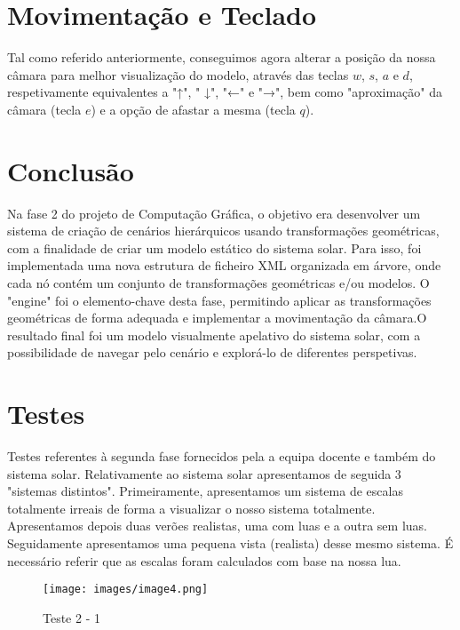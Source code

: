 \documentclass{article}
\begin{document}
\newpage
\section{Movimentação e Teclado}

Tal como referido anteriormente, conseguimos agora alterar a posição da nossa câmara para melhor visualização do modelo, através das teclas $w$, $s$, $a$ e $d$, respetivamente equivalentes a "↑", " ↓", "←" e "→", bem como "aproximação" da câmara (tecla $e$) e a opção de afastar a mesma (tecla $q$).

\newpage

\section{Conclusão}
Na fase 2 do projeto de Computação Gráfica, o objetivo era desenvolver um sistema de criação de cenários hierárquicos usando transformações geométricas, com a finalidade de criar um modelo estático do sistema solar. Para isso, foi implementada uma nova estrutura de ficheiro XML organizada em árvore, onde cada nó contém um conjunto de transformações geométricas e/ou modelos. O "engine" foi o elemento-chave desta fase, permitindo aplicar as transformações geométricas de forma adequada e implementar a movimentação da câmara.O resultado final foi um modelo visualmente apelativo do sistema solar, com a possibilidade de navegar pelo cenário e explorá-lo de diferentes perspetivas.

\newpage

\section{Testes}
Testes referentes à segunda fase fornecidos pela a equipa docente e também do sistema solar.
Relativamente ao sistema solar apresentamos de seguida 3 "sistemas distintos".
Primeiramente, apresentamos um sistema de escalas totalmente irreais de forma a visualizar o nosso sistema totalmente.
Apresentamos depois duas verões realistas, uma com luas e a outra sem luas.
Seguidamente apresentamos uma pequena vista (realista) desse mesmo sistema.
É necessário referir que as escalas foram calculados com base na nossa lua.

\begin{figure}[h]
    \centering
    \texttt{[image: images/image4.png]}
    \caption{Teste 2 - 1}
    \label{fig:exemplo}
\end{figure}
\end{document}
